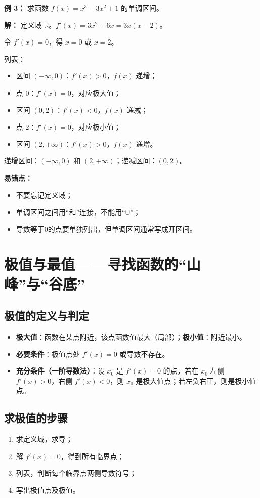 \documentclass[10pt]{article}
\begin{document}
\textbf{例 3：} 求函数 $f(x) = x^3 - 3x^2 + 1$ 的单调区间。

\textbf{解：} 定义域 $\mathbb{R}$。$f'(x) = 3x^2 - 6x = 3x(x-2)$。

令 $f'(x)=0$，得 $x=0$ 或 $x=2$。

列表：
\begin{itemize}
    \item 区间 $(-\infty,0)$：$f'(x)>0$，$f(x)$ 递增；
    \item 点 $0$：$f'(x)=0$，对应极大值；
    \item 区间 $(0,2)$：$f'(x)<0$，$f(x)$ 递减；
    \item 点 $2$：$f'(x)=0$，对应极小值；
    \item 区间 $(2,+\infty)$：$f'(x)>0$，$f(x)$ 递增。
\end{itemize}
递增区间：$(-\infty,0)$ 和 $(2,+\infty)$；递减区间：$(0,2)$。

\textbf{易错点：}
\begin{itemize}
    \item 不要忘记定义域；
    \item 单调区间之间用“和”连接，不能用“$\cup$”；
    \item 导数等于0的点要单独列出，但单调区间通常写成开区间。
\end{itemize}

\section{极值与最值——寻找函数的“山峰”与“谷底”}
\subsection{极值的定义与判定}
\begin{itemize}
    \item \textbf{极大值}：函数在某点附近，该点函数值最大（局部）；\textbf{极小值}：附近最小。
    \item \textbf{必要条件}：极值点处 $f'(x)=0$ 或导数不存在。
    \item \textbf{充分条件（一阶导数法）}：设 $x_0$ 是 $f'(x)=0$ 的点，若在 $x_0$ 左侧 $f'(x)>0$，右侧 $f'(x)<0$，则 $x_0$ 是极大值点；若左负右正，则是极小值点。
\end{itemize}

\subsection{求极值的步骤}
\begin{enumerate}
    \item 求定义域，求导；
    \item 解 $f'(x)=0$，得到所有临界点；
    \item 列表，判断每个临界点两侧导数符号；
    \item 写出极值点及极值。
\end{enumerate}
\end{document}
